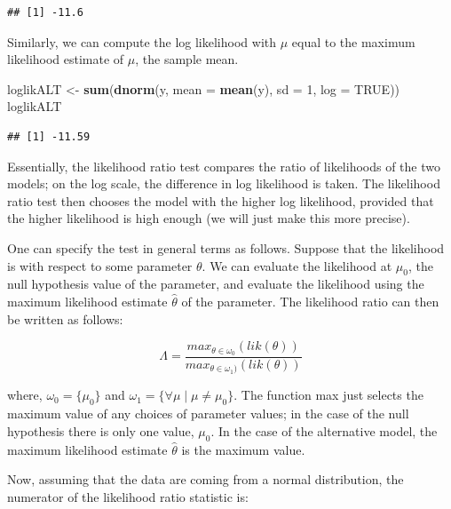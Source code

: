 \documentclass[12pt,]{krantz}
\newenvironment{Shaded}{\begin{snugshade}}{\end{snugshade}}
\newcommand{\DataTypeTok}[1]{\textcolor[rgb]{0.13,0.29,0.53}{#1}}
\newcommand{\DecValTok}[1]{\textcolor[rgb]{0.00,0.00,0.81}{#1}}
\newcommand{\KeywordTok}[1]{\textcolor[rgb]{0.13,0.29,0.53}{\textbf{#1}}}
\newcommand{\NormalTok}[1]{#1}
\newcommand{\OtherTok}[1]{\textcolor[rgb]{0.56,0.35,0.01}{#1}}
\newcommand{\StringTok}[1]{\textcolor[rgb]{0.31,0.60,0.02}{#1}}
\begin{document}
\begin{verbatim}
## [1] -11.6
\end{verbatim}

Similarly, we can compute the log likelihood with \(\mu\) equal to the maximum likelihood estimate of \(\mu\), the sample mean.

\begin{Shaded}
\begin{Highlighting}[]
\NormalTok{loglikALT <-}\StringTok{ }\KeywordTok{sum}\NormalTok{(}\KeywordTok{dnorm}\NormalTok{(y, }\DataTypeTok{mean =} \KeywordTok{mean}\NormalTok{(y), }
  \DataTypeTok{sd =} \DecValTok{1}\NormalTok{, }\DataTypeTok{log =} \OtherTok{TRUE}\NormalTok{))}
\NormalTok{loglikALT}
\end{Highlighting}
\end{Shaded}

\begin{verbatim}
## [1] -11.59
\end{verbatim}

Essentially, the likelihood ratio test compares the ratio of likelihoods of the two models; on the log scale, the difference in log likelihood is taken.
The likelihood ratio test then chooses the model with the higher log likelihood, provided that the higher likelihood is high enough (we will just make this more precise).

One can specify the test in general terms as follows. Suppose that the likelihood is with respect to some parameter \(\theta\). We can evaluate the likelihood at \(\mu_0\), the null hypothesis value of the parameter, and evaluate the likelihood using the maximum likelihood estimate \(\hat\theta\) of the parameter. The likelihood ratio can then be written as follows:

\begin{equation}
\Lambda = \frac{max_{\theta\in \omega_0}(lik(\theta))}{max_{\theta\in \omega_1)}(lik(\theta))}
\end{equation}

where, \(\omega_0=\{\mu_0\}\) and \(\omega_1=\{\forall \mu \mid \mu\neq \mu_0\}\). The function max just selects the maximum value of any choices of parameter values; in the case of the null hypothesis there is only one value, \(\mu_0\). In the case of the alternative model, the maximum likelihood estimate \(\hat\theta\) is the maximum value.

Now, assuming that the data are coming from a normal distribution, the numerator of the likelihood ratio statistic is:
\end{document}
